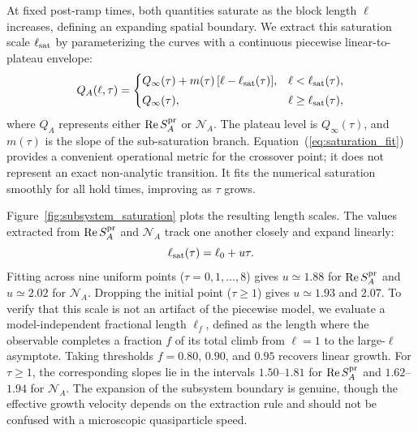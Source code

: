 \documentclass[aps,prb,reprint,superscriptaddress,amsmath,amssymb,floatfix]{revtex4-2}
\begin{document}
  At fixed post-ramp times, both quantities saturate as the block length $\ell$ increases, defining an expanding spatial boundary. We extract this saturation scale $\ell_{\rm sat}$ by parameterizing the curves with a continuous piecewise linear-to-plateau envelope:
\begin{equation}
Q_A(\ell,\tau) = \begin{cases} Q_\infty(\tau) + m(\tau)\,[\ell-\ell_{\rm sat}(\tau)], & \ell<\ell_{\rm sat}(\tau), \\[1mm] Q_\infty(\tau), & \ell\ge\ell_{\rm sat}(\tau), \end{cases}
\label{eq:saturation_fit}
\end{equation}
where $Q_A$ represents either $\operatorname{Re}S_A^{\rm pr}$ or $\mathcal N_A$. The plateau level is $Q_\infty(\tau)$, and $m(\tau)$ is the slope of the sub-saturation branch.
%
Equation~(\ref{eq:saturation_fit}) provides a convenient operational metric for the crossover point; it does not represent an exact non-analytic transition. It fits the numerical saturation smoothly for all hold times, improving as $\tau$ grows.

  Figure~\ref{fig:subsystem_saturation} plots the resulting length scales. The values extracted from $\operatorname{Re}S_A^{\rm pr}$ and $\mathcal N_A$ track one another closely and expand linearly:
\begin{equation}
\ell_{\rm sat}(\tau) = \ell_0+u\tau .
\label{eq:saturation_length_growth}
\end{equation}
Fitting across nine uniform points ($\tau=0,1,\ldots,8$) gives $u\simeq1.88$ for $\operatorname{Re}S_A^{\rm pr}$ and $u\simeq2.02$ for $\mathcal N_A$. Dropping the initial point ($\tau\ge1$) gives $u\simeq1.93$ and $2.07$.
%
To verify that this scale is not an artifact of the piecewise model, we evaluate a model-independent fractional length $\ell_f$, defined as the length where the observable completes a fraction $f$ of its total climb from $\ell=1$ to the large-$\ell$ asymptote. Taking thresholds $f=0.80$, $0.90$, and $0.95$ recovers linear growth. For $\tau\ge1$, the corresponding slopes lie in the intervals $1.50$--$1.81$ for $\operatorname{Re}S_A^{\rm pr}$ and $1.62$--$1.94$ for $\mathcal N_A$. The expansion of the subsystem boundary is genuine, though the effective growth velocity depends on the extraction rule and should not be confused with a microscopic quasiparticle speed.
\end{document}
